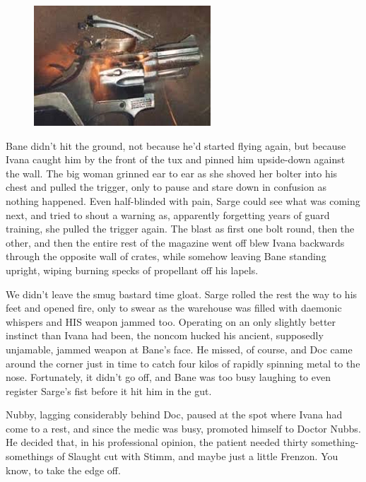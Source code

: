 \begin{figure}
	\begin{center}
		\includegraphics[width=\figwidth]{pics/19/53.png}
	\end{center}
\end{figure}
Bane didn't hit the ground, not because he'd started flying again, but because Ivana caught him by the front of the tux and pinned him upside-down against the wall. 
The big woman grinned ear to ear as she shoved her bolter into his chest and pulled the trigger, only to pause and stare down in confusion as nothing happened. 
Even half-blinded with pain, Sarge could see what was coming next, and tried to shout a warning as, apparently forgetting years of guard training, she pulled the trigger again. 
The blast as first one bolt round, then the other, and then the entire rest of the magazine went off blew Ivana backwards through the opposite wall of crates, while somehow leaving Bane standing upright, wiping burning specks of propellant off his lapels. 


We didn't leave the smug bastard time gloat. 
Sarge rolled the rest the way to his feet and opened fire, only to swear as the warehouse was filled with daemonic whispers and HIS weapon jammed too. 
Operating on an only slightly better instinct than Ivana had been, the noncom hucked his ancient, supposedly unjamable, jammed weapon at Bane's face. 
He missed, of course, and Doc came around the corner just in time to catch four kilos of rapidly spinning metal to the nose. 
Fortunately, it didn't go off, and Bane was too busy laughing to even register Sarge's fist before it hit him in the gut.

Nubby, lagging considerably behind Doc, paused at the spot where Ivana had come to a rest, and since the medic was busy, promoted himself to Doctor Nubbs. 
He decided that, in his professional opinion, the patient needed thirty something-somethings of Slaught cut with Stimm, and maybe just a little Frenzon. 
You know, to take the edge off.

